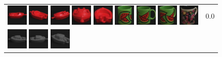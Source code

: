 {\begin{figure}[p]
\begin{tabular}{m{11cm} | m{3cm} |}
\includegraphics[width=1cm]{coil/beeld-19.eps}
\includegraphics[width=1cm]{coil/beeld-22.eps}
\includegraphics[width=1cm]{coil/beeld-21.eps}
\includegraphics[width=1cm]{coil/beeld-20.eps}
\includegraphics[width=1cm]{coil/beeld-23.eps}
\includegraphics[width=1cm]{coil/beeld-32.eps}
\includegraphics[width=1cm]{coil/beeld-30.eps}
\includegraphics[width=1cm]{coil/beeld-33.eps}
\includegraphics[width=1cm]{coil/beeld-63.eps}
& {\scriptsize 0.0}
\\
\includegraphics[width=1cm]{coil/beeld-24.eps}
\includegraphics[width=1cm]{coil/beeld-25.eps}
\includegraphics[width=1cm]{coil/beeld-28.eps}

\end{tabular}
\end{figure}}
